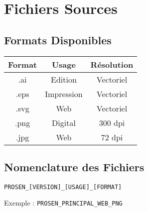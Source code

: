 \documentclass[11pt,a4paper]{report}
\begin{document}
\chapter{Fichiers Sources}

\section{Formats Disponibles}

\begin{tcolorbox}[title=Ressources Graphiques]
\begin{center}
\begin{tabular}{|c|c|c|}
\hline
\textbf{Format} & \textbf{Usage} & \textbf{Résolution} \\
\hline
.ai & Edition & Vectoriel \\
.eps & Impression & Vectoriel \\
.svg & Web & Vectoriel \\
.png & Digital & 300 dpi \\
.jpg & Web & 72 dpi \\
\hline
\end{tabular}
\end{center}
\end{tcolorbox}

\section{Nomenclature des Fichiers}

\begin{tcolorbox}[title=Convention de Nommage]
\texttt{PROSEN\_[VERSION]\_[USAGE]\_[FORMAT]}

Exemple : \texttt{PROSEN\_PRINCIPAL\_WEB\_PNG}
\end{tcolorbox}
\end{document}
